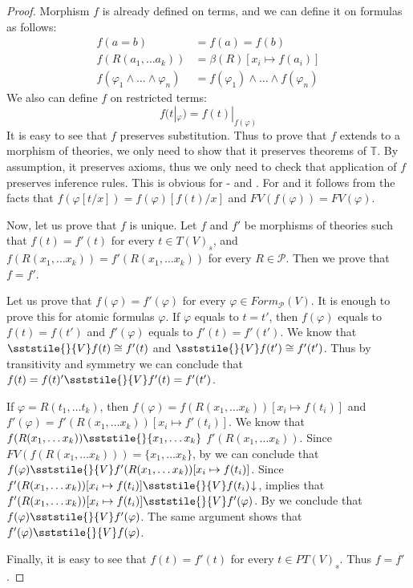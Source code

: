 \begin{proof}
Morphism $f$ is already defined on terms, and we can define it on formulas as follows:
\begin{align*}
f(a = b) & = f(a) = f(b) \\
f(R(a_1, \ldots a_k)) & = \beta(R)[x_i \mapsto f(a_i)] \\
f(\varphi_1 \land \ldots \land \varphi_n) & = f(\varphi_1) \land \ldots \land f(\varphi_n)
\end{align*}
We also can define $f$ on restricted terms:
\[ f(t|_\varphi) = f(t)|_{f(\varphi)} \]
It is easy to see that $f$ preserves substitution.
Thus to prove that $f$ extends to a morphism of theories, we only need to show that it preserves theorems of $\mathbb{T}$.
By assumption, it preserves axioms, thus we only need to check that application of $f$ preserves inference rules.
This is obvious for - and .
For  and  it follows from the facts that $f(\varphi[t/x]) = f(\varphi)[f(t)/x]$ and $FV(f(\varphi)) = FV(\varphi)$.

Now, let us prove that $f$ is unique.
Let $f$ and $f'$ be morphisms of theories such that $f(t) = f'(t)$ for every $t \in T(V)_s$, and
    $f(R(x_1, \ldots x_k)) = f'(R(x_1, \ldots x_k))$ for every $R \in \mathcal{P}$.
Then we prove that $f = f'$.

Let us prove that $f(\varphi) = f'(\varphi)$ for every $\varphi \in Form_\mathcal{P}(V)$.
It is enough to prove this for atomic formulas $\varphi$.
If $\varphi$ equals to $t = t'$, then $f(\varphi)$ equals to $f(t) = f(t')$ and $f'(\varphi)$ equals to $f'(t) = f'(t')$.
We know that $\sststile{}{V} f(t) \cong f'(t)$ and $\sststile{}{V} f(t') \cong f'(t')$.
Thus by transitivity and symmetry we can conclude that $f(t) = f(t)' \sststile{}{V} f'(t) = f'(t')$.

If $\varphi = R(t_1, \ldots t_k)$, then $f(\varphi) = f(R(x_1, \ldots x_k))[x_i \mapsto f(t_i)]$
    and $f'(\varphi) = f'(R(x_1, \ldots x_k))[x_i \mapsto f'(t_i)]$.
We know that $f(R(x_1, \ldots x_k)) \sststile{}{x_1, \ldots x_k}$ \linebreak $f'(R(x_1, \ldots x_k))$.
Since $FV(f(R(x_1, \ldots x_k))) = \{ x_1, \ldots x_k \}$, by  we can conclude that $f(\varphi) \sststile{}{V} f'(R(x_1, \ldots x_k))[x_i \mapsto f(t_i)]$.
Since $f'(R(x_1, \ldots x_k))[x_i \mapsto f(t_i)] \sststile{}{V} f(t_i)\!\downarrow$,  implies that
    $f'(R(x_1, \ldots x_k))[x_i \mapsto f(t_i)] \sststile{}{V} f'(\varphi)$.
By  we conclude that $f(\varphi) \sststile{}{V} f'(\varphi)$.
The same argument shows that $f'(\varphi) \sststile{}{V} f(\varphi)$.

Finally, it is easy to see that $f(t) = f'(t)$ for every $t \in PT(V)_s$.
Thus $f = f'$.
\end{proof}

